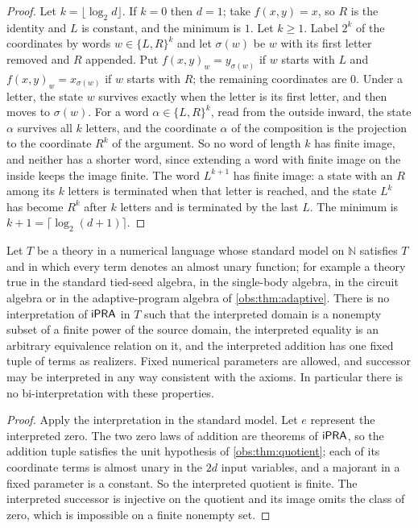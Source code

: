 \begin{proof}
Let $k=\lfloor\log_2 d\rfloor$. If $k=0$ then $d=1$; take $f(x,y)=x$, so $R$ is
the identity and $L$ is constant, and the minimum is $1$. Let $k\ge 1$. Label
$2^k$ of the coordinates by words $w\in\{L,R\}^k$ and let $\sigma(w)$ be $w$
with its first letter removed and $R$ appended. Put
$f(x,y)_w=y_{\sigma(w)}$ if $w$ starts with $L$ and
$f(x,y)_w=x_{\sigma(w)}$ if $w$ starts with $R$; the remaining coordinates are
$0$. Under a letter, the state $w$ survives exactly when the letter is its
first letter, and then moves to $\sigma(w)$. For a word
$\alpha\in\{L,R\}^k$, read from the outside inward, the state $\alpha$
survives all $k$ letters, and the coordinate $\alpha$ of the composition is
the projection to the coordinate $R^k$ of the argument. So no word of length
$k$ has finite image, and neither has a shorter word, since extending a word
with finite image on the inside keeps the image finite. The word $L^{k+1}$ has
finite image: a state with an $R$ among its $k$ letters is terminated when that
letter is reached, and the state $L^k$ has become $R^k$ after $k$ letters and
is terminated by the last $L$. The minimum is $k+1=\lceil\log_2(d+1)\rceil$.
\end{proof}

\begin{corollary}
\label{obs:cor:no-term-interp}
Let $T$ be a theory in a numerical language whose standard model on
$\mathbb{N}$ satisfies $T$ and in which every term denotes an almost unary
function; for example a theory true in the standard tied-seed algebra, in the
single-body algebra, in the circuit algebra or in the adaptive-program algebra
of \cref{obs:thm:adaptive}. There is no interpretation of
$\mathsf{iPRA}$ in $T$ such that the interpreted domain is a nonempty subset of a
finite power of the source domain, the interpreted equality is an arbitrary
equivalence relation on it, and the interpreted addition has one fixed tuple of
terms as realizers. Fixed numerical parameters are allowed, and successor may
be interpreted in any way consistent with the axioms. In particular there is no
bi-interpretation with these properties.
\end{corollary}

\begin{proof}
Apply the interpretation in the standard model. Let $e$ represent the
interpreted zero. The two zero laws of addition are theorems of $\mathsf{iPRA}$, so the
addition tuple satisfies the unit hypothesis of \cref{obs:thm:quotient}; each
of its coordinate terms is almost unary in the $2d$ input variables, and a
majorant in a fixed parameter is a constant. So the interpreted quotient is
finite. The interpreted successor is injective on the quotient and its image
omits the class of zero, which is impossible on a finite nonempty set.
\end{proof}

